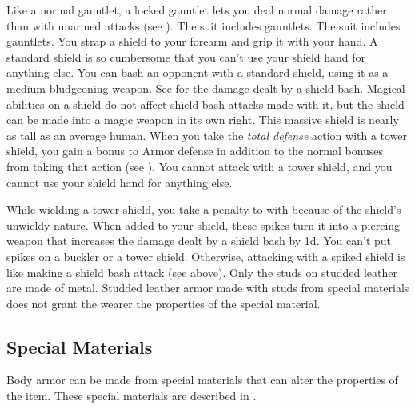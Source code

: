         Like a normal gauntlet, a locked gauntlet lets you deal normal damage rather than  with unarmed attacks (see ).
         The suit includes gauntlets.
         The suit includes gauntlets.
         You strap a shield to your forearm and grip it with your hand. A standard shield is so cumbersome that you can't use your shield hand for anything else.
         You can bash an opponent with a standard shield, using it as a medium bludgeoning weapon. See  for the damage dealt by a shield bash.
        Magical abilities on a shield do not affect shield bash attacks made with it, but the shield can be made into a magic weapon in its own right.
         This massive shield is nearly as tall as an average human.
        When you take the \textit{total defense} action with a tower shield, you gain a  bonus to Armor defense in addition to the normal bonuses from taking that action (see ).
        You cannot attack with a tower shield, and you cannot use your shield hand for anything else.

        While wielding a tower shield, you take a  penalty to  with  because of the shield's unwieldy nature.
         When added to your shield, these spikes turn it into a piercing weapon that increases the damage dealt by a shield bash by \plus1d. You can't put spikes on a buckler or a tower shield. Otherwise, attacking with a spiked shield is like making a shield bash attack (see above).
         Only the studs on studded leather are made of metal.
        Studded leather armor made with studs from special materials does not grant the wearer the properties of the special material.

    \subsection{Special Materials}\label{Special Materials}
        Body armor can be made from special materials that can alter the properties of the item.
        These special materials are described in .

